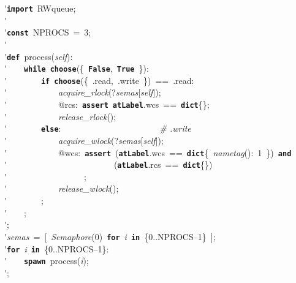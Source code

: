 \'\>\texttt{\textbf{import}}~RWqueue;\\

\'\>\\

\'\>\texttt{\textbf{const}}~NPROCS~=~3;\\

\'\>\\

\'\>\texttt{\textbf{def}}~process(\textit{self}):\\

\'\>~~~~\texttt{\textbf{while}}~\texttt{\textbf{choose}}(\{~\texttt{\textbf{False}},~\texttt{\textbf{True}}~\}):\\

\'\>~~~~~~~~\texttt{\textbf{if}}~\texttt{\textbf{choose}}(\{~.read,~.write~\})~==~.read:\\

\'\>~~~~~~~~~~~~\textit{acquire\_rlock}(?\textit{semas}[\textit{self}]);\\

\'\>~~~~~~~~~~~~@rcs:~\texttt{\textbf{assert}}~\texttt{\textbf{atLabel}}.wcs~==~\texttt{\textbf{dict}}\{\};\\

\'\>~~~~~~~~~~~~\textit{release\_rlock}();\\

\'\>~~~~~~~~\texttt{\textbf{else}}:~~~~~~~~~~~~~~~~~~~~~~~\emph{\# .write}\\

\'\>~~~~~~~~~~~~\textit{acquire\_wlock}(?\textit{semas}[\textit{self}]);\\

\'\>~~~~~~~~~~~~@wcs:~\texttt{\textbf{assert}}~(\texttt{\textbf{atLabel}}.wcs~==~\texttt{\textbf{dict}}\{~\textit{nametag}():~1~\})~\texttt{\textbf{and}}\\

\'\>~~~~~~~~~~~~~~~~~~~~~~~~~(\texttt{\textbf{atLabel}}.rcs~==~\texttt{\textbf{dict}}\{\})\\

\'\>~~~~~~~~~~~~~~~~~~;\\

\'\>~~~~~~~~~~~~\textit{release\_wlock}();\\

\'\>~~~~~~~~;\\

\'\>~~~~;\\

\'\>;\\

\'\>\textit{semas}~=~[~\textit{Semaphore}(0)~\texttt{\textbf{for}}~\textit{i}~\texttt{\textbf{in}}~\{0..NPROCS--1\}~];\\

\'\>\texttt{\textbf{for}}~\textit{i}~\texttt{\textbf{in}}~\{0..NPROCS--1\}:\\

\'\>~~~~\texttt{\textbf{spawn}}~process(\textit{i});\\

\'\>;